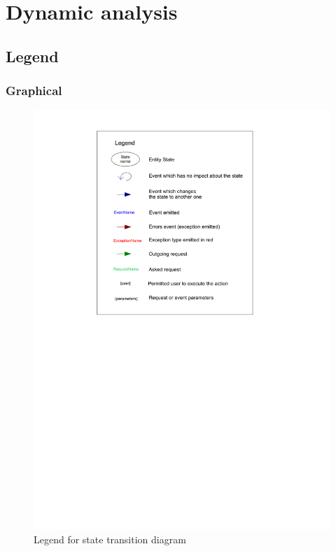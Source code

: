 \chapter{Dynamic analysis}

\section{Legend}
	\subsection{Graphical}
	\begin{figure}[ht]
			\begin{center}
				\includegraphics[width=\textwidth,  trim=2cm 14cm 2cm 1cm]{UML_figure/state_transition/dojo_logic/st_legend.pdf}
				\caption{Legend for state transition diagram}
			\end{center}
	\end{figure}
\newpage
